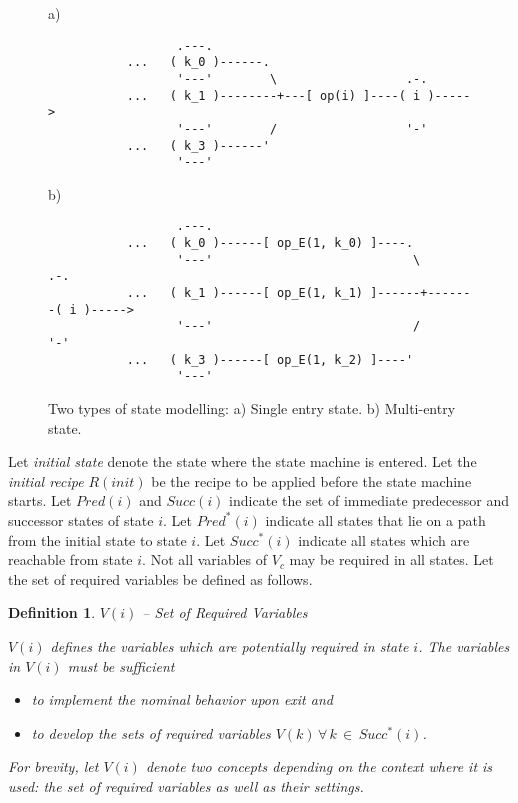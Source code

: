 \documentclass[12pt,a4paper]{scrartcl}
\newtheorem{definition}{Definition}
\begin{document}
\begin{figure}[htbp] \leavevmode \label{fig:se-vs-me}
a)

\begin{verbatim}
                  .---.  
           ...   ( k_0 )------.
                  '---'        \                  .-.
           ...   ( k_1 )--------+---[ op(i) ]----( i )----->   
                  '---'        /                  '-'
           ...   ( k_3 )------'       
                  '---'
\end{verbatim}
     
b)
     
\begin{verbatim}
                  .---.
           ...   ( k_0 )------[ op_E(1, k_0) ]----.
                  '---'                            \         .-.
           ...   ( k_1 )------[ op_E(1, k_1) ]------+-------( i )----->  
                  '---'                            /         '-'
           ...   ( k_3 )------[ op_E(1, k_2) ]----'       
                  '---'
\end{verbatim}
\caption{Two types of state modelling: a) Single entry state. 
b) Multi-entry state.}
\end{figure}

Let \textit{initial state} denote the state where the state machine is entered.
Let the \textit{initial recipe} $R(init)$ be the recipe to be applied before
the state machine starts.  Let $Pred(i)$ and $Succ(i)$ indicate the set of
immediate predecessor and successor states of state $i$. Let $Pred^*(i)$
indicate all states that lie on a path from the initial state to state $i$.
Let $Succ^*(i)$ indicate all states which are reachable from state $i$. Not all
variables of $V_c$ may be required in all states. Let the set of required
variables be defined as follows.

\begin{definition}
$V(i)$ -- Set of Required Variables

$V(i)$ defines the variables which are potentially required in state $i$.  The
variables in $V(i)$ must be sufficient

\begin{itemize}
\item to implement the nominal behavior upon exit and
\item to develop the sets of required variables $V(k)\,\forall\,k\,\in\,Succ^*(i)$. 
\end{itemize}

For brevity, let $V(i)$ denote two concepts depending on the context where it
is used: the set of required variables as well as their settings.

\end{definition}
\end{document}
